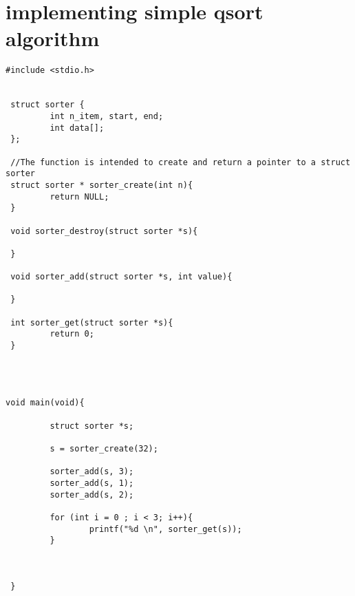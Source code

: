 \section{implementing simple qsort algorithm}

\begin{lstlisting}
#include <stdio.h>


 struct sorter {
         int n_item, start, end;
         int data[];
 };

 //The function is intended to create and return a pointer to a struct sorter
 struct sorter * sorter_create(int n){
         return NULL;
 }

 void sorter_destroy(struct sorter *s){

 }

 void sorter_add(struct sorter *s, int value){

 }

 int sorter_get(struct sorter *s){
         return 0;
 }




void main(void){

         struct sorter *s;

         s = sorter_create(32);

         sorter_add(s, 3);
         sorter_add(s, 1);
         sorter_add(s, 2);

         for (int i = 0 ; i < 3; i++){
                 printf("%d \n", sorter_get(s));
         }



 }
\end{lstlisting}

